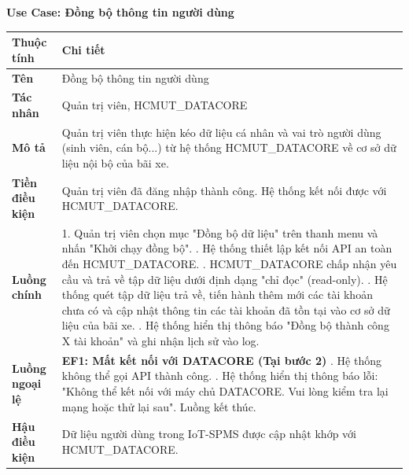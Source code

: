 \newpage
\noindent \textbf{Use Case: Đồng bộ thông tin người dùng} \\
\renewcommand{\arraystretch}{1.6}
\begin{xltabular}{\textwidth}{|l|X|}
\hline
\textbf{Thuộc tính} & \textbf{Chi tiết} \\
\hline
\textbf{Tên} & Đồng bộ thông tin người dùng \\
\hline
\textbf{Tác nhân} & Quản trị viên, HCMUT\_DATACORE \\
\hline
\textbf{Mô tả} & Quản trị viên thực hiện kéo dữ liệu cá nhân và vai trò người dùng (sinh viên, cán bộ...) từ hệ thống HCMUT\_DATACORE về cơ sở dữ liệu nội bộ của bãi xe. \\
\hline
\textbf{Tiền điều kiện} & Quản trị viên đã đăng nhập thành công. Hệ thống kết nối được với HCMUT\_DATACORE. \\
\hline
\textbf{Luồng chính} & 
1. Quản trị viên chọn mục "Đồng bộ dữ liệu" trên thanh menu và nhấn "Khởi chạy đồng bộ". . Hệ thống thiết lập kết nối API an toàn đến HCMUT\_DATACORE. . HCMUT\_DATACORE chấp nhận yêu cầu và trả về tập dữ liệu dưới định dạng "chỉ đọc" (read-only). . Hệ thống quét tập dữ liệu trả về, tiến hành thêm mới các tài khoản chưa có và cập nhật thông tin các tài khoản đã tồn tại vào cơ sở dữ liệu của bãi xe. . Hệ thống hiển thị thông báo "Đồng bộ thành công X tài khoản" và ghi nhận lịch sử vào log. \\
\hline
\textbf{Luồng ngoại lệ} & 
\textbf{EF1: Mất kết nối với DATACORE (Tại bước 2)} . Hệ thống không thể gọi API thành công. . Hệ thống hiển thị thông báo lỗi: "Không thể kết nối với máy chủ DATACORE. Vui lòng kiểm tra lại mạng hoặc thử lại sau". Luồng kết thúc. \\
\hline
\textbf{Hậu điều kiện} & Dữ liệu người dùng trong IoT-SPMS được cập nhật khớp với HCMUT\_DATACORE. \\
\hline
\end{xltabular}

